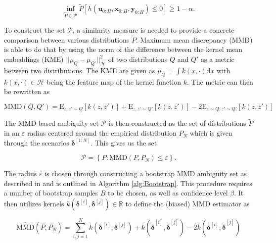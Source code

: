 \begin{equation} \label{wc constraints}
\inf\limits_{\tilde{P} \in \mathcal{P}}\tilde{P} \left[ h(\boldsymbol{u}_{0:H},  \boldsymbol{x}_{0:H},  \boldsymbol{y}_{0:H}) \leq 0 \right] \geq 1 - \alpha.
\end{equation}

To construct the set $\mathcal{P}$, a similarity measure is needed to provide a concrete comparison between various distributions $\tilde{P}$. Maximum mean discrepancy (MMD) \cite{Arthur_12} is able to do that by using the norm of the difference between the kernel mean embeddings (KME) $|| \mu_Q - \mu_{Q'} ||^2_{\mathcal{H}}$ of two distributions $Q$ and $Q'$ as a metric between two distributions. The KME are given as $\mu_Q = \int k(x, \cdot) \text{d}x$ with $k(x, \cdot) \in \mathcal{H}$ being the feature map of the kernel function $k$. The metric can then be rewritten as 

\begin{equation} \label{MMD Kernel}
\text{MMD}(Q, Q') = \text{E}_{z,z' \sim Q}[k(z,z')] + \text{E}_{z,z' \sim Q'}[k(z,z')] - 2\text{E}_{z\sim Q, z' \sim Q'}[k(z,z')]
\end{equation}

The MMD-based ambiguity set $\mathcal{P}$ is then constructed as the set of distributions $\tilde{P}$ in an $\varepsilon$ radius centered around the empirical distribution $P_N$ which is given through the scenarios $\boldsymbol{\delta}^{[1:N]}$. This gives us the set

\begin{equation} \label{ambiguity set}
\mathcal{P} =  \left\{ P : \text{MMD} (P, P_N) \leq \varepsilon \right\}.
\end{equation}

The radius $\varepsilon$ is chosen through constructing a bootstrap MMD ambiguity set as described in \cite{Yassine_22} and is outlined in Algorithm \ref{alg:Bootstrap}. This procedure requires a number of bootstrap samples $B$ to be chosen, as well as confidence level $\beta$. It then utilizes kernels $k(\boldsymbol{\delta}^{[i]}, \boldsymbol{\delta}^{[j]}) \in \mathbb{R}$ to define the (biased) MMD estimator as 

\begin{equation} \label{ambiguity set approx}
\widehat{\text{MMD}} (\tilde{P}, P_N) = \sum_{i,j = 1}^N k(\boldsymbol{\delta}^{[i]}, \boldsymbol{\delta}^{[j]}) + k(\tilde{\boldsymbol{\delta}}^{[i]}, \tilde{\boldsymbol{\delta}}^{[j]}) - 2 k(\boldsymbol{\delta}^{[i]}, \tilde{\boldsymbol{\delta}}^{[j]})
\end{equation}

